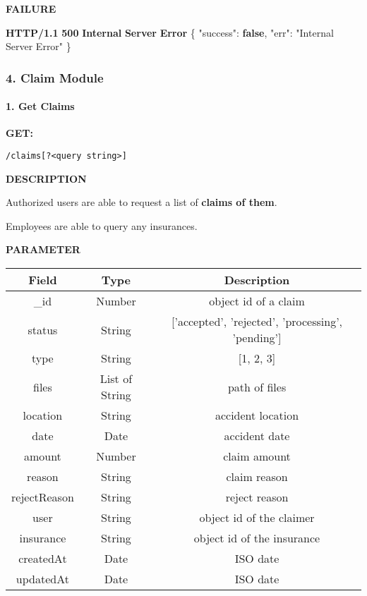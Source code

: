 \documentclass[
]{article}
\newenvironment{Shaded}{}{}
\newcommand{\DataTypeTok}[1]{\textcolor[rgb]{0.56,0.13,0.00}{#1}}
\newcommand{\ErrorTok}[1]{\textcolor[rgb]{1.00,0.00,0.00}{\textbf{#1}}}
\newcommand{\FunctionTok}[1]{\textcolor[rgb]{0.02,0.16,0.49}{#1}}
\newcommand{\KeywordTok}[1]{\textcolor[rgb]{0.00,0.44,0.13}{\textbf{#1}}}
\newcommand{\StringTok}[1]{\textcolor[rgb]{0.25,0.44,0.63}{#1}}
\begin{document}
\textbf{FAILURE}

\begin{Shaded}
\begin{Highlighting}[]
\ErrorTok{HTTP/1.1} \ErrorTok{500} \ErrorTok{Internal} \ErrorTok{Server} \ErrorTok{Error}
\FunctionTok{\{}
    \DataTypeTok{"success"}\FunctionTok{:} \KeywordTok{false}\FunctionTok{,}
    \DataTypeTok{"err"}\FunctionTok{:} \StringTok{"Internal Server Error"}
\FunctionTok{\}}
\end{Highlighting}
\end{Shaded}

\hypertarget{header-n774}{%
\subsubsection{4. Claim Module}\label{header-n774}}

\hypertarget{header-n775}{%
\paragraph{1. Get Claims}\label{header-n775}}

\textbf{GET:}

\begin{verbatim}
/claims[?<query string>]
\end{verbatim}

\textbf{DESCRIPTION}

Authorized users are able to request a list of \textbf{claims of them}.

Employees are able to query any insurances.

\textbf{PARAMETER}

\begin{longtable}[]{@{}ccc@{}}
\toprule
Field & Type & Description\tabularnewline
\midrule
\endhead
\_id & Number & object id of a claim\tabularnewline
status & String & {[}'accepted', 'rejected', 'processing',
'pending'{]}\tabularnewline
type & String & {[}1, 2, 3{]}\tabularnewline
files & List of String & path of files\tabularnewline
location & String & accident location\tabularnewline
date & Date & accident date\tabularnewline
amount & Number & claim amount\tabularnewline
reason & String & claim reason\tabularnewline
rejectReason & String & reject reason\tabularnewline
user & String & object id of the claimer\tabularnewline
insurance & String & object id of the insurance\tabularnewline
createdAt & Date & ISO date\tabularnewline
updatedAt & Date & ISO date\tabularnewline
\bottomrule
\end{longtable}
\end{document}
